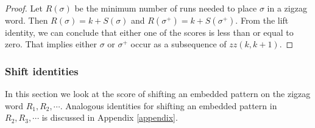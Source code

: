 \documentclass[a4paper,12pt]{article}
\theoremstyle{definition}
\numberwithin{equation}{section}
\begin{document}
\begin{proof}
    Let $R(\sigma)$ be the minimum number of runs needed to place $\sigma$ in a zigzag word. Then $R(\sigma)=k+S(\sigma)$ and $R(\sigma^+)=k+S(\sigma^+).$ From the lift identity, we can conclude that either one of the scores is less than or equal to zero. That implies either $\sigma$ or $\sigma^+$ occur as a subsequence of $zz(k,k+1)$. 
\end{proof}



\subsubsection{Shift identities}
In this section we look at the score of shifting an embedded pattern on the zigzag word  $R_1,R_2 , \cdots$.  Analogous identities for shifting an embedded pattern in $R_2,R_3, \cdots$ is discussed in Appendix \ref{appendix}. 
\end{document}
